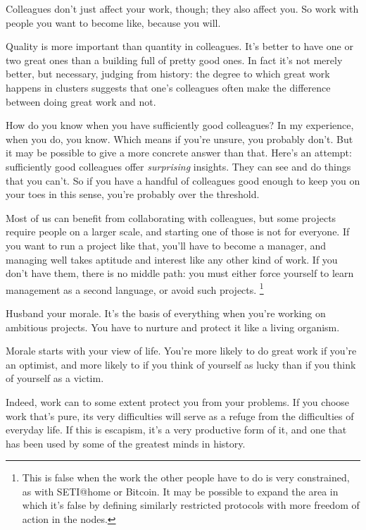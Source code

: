 Colleagues don't just affect your work, though; they also affect you. So
work with people you want to become like, because you will.

Quality is more important than quantity in colleagues. It's better to
have one or two great ones than a building full of pretty good ones. In
fact it's not merely better, but necessary, judging from history: the
degree to which great work happens in clusters suggests that one's
colleagues often make the difference between doing great work and not.

How do you know when you have sufficiently good colleagues? In my
experience, when you do, you know. Which means if you're unsure, you
probably don't. But it may be possible to give a more concrete answer
than that. Here's an attempt: sufficiently good colleagues offer
\emph{surprising} insights. They can see and do things that you can't.
So if you have a handful of colleagues good enough to keep you on your
toes in this sense, you're probably over the threshold.

Most of us can benefit from collaborating with colleagues, but some
projects require people on a larger scale, and starting one of those is
not for everyone. If you want to run a project like that, you'll have to
become a manager, and managing well takes aptitude and interest like any
other kind of work. If you don't have them, there is no middle path: you
must either force yourself to learn management as a second language, or
avoid such projects. \footnote{This is false when the work the other people have to do is very
constrained, as with SETI@home or Bitcoin. It may be possible to expand
the area in which it's false by defining similarly restricted protocols
with more freedom of action in the nodes.}

Husband your morale. It's the basis of everything when you're working on
ambitious projects. You have to nurture and protect it like a living
organism.

Morale starts with your view of life. You're more likely to do great
work if you're an optimist, and more likely to if you think of yourself
as lucky than if you think of yourself as a victim.

Indeed, work can to some extent protect you from your problems. If you
choose work that's pure, its very difficulties will serve as a refuge
from the difficulties of everyday life. If this is escapism, it's a very
productive form of it, and one that has been used by some of the
greatest minds in history.


